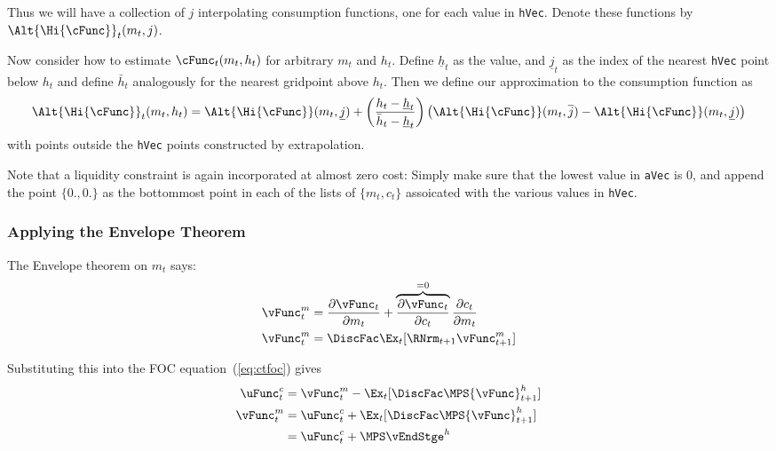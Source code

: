 \documentclass[\econtexRoot/SolvingMicroDSOPs]{subfiles}
\begin{document}
Thus we will have a collection of $j$ interpolating consumption
functions, one for each value in \texttt{hVec}.  Denote these
functions by $\Alt{\Hi{\cFunc}}_{t}({m}_{t},j)$.

Now consider how to estimate $\cFunc_{t}({m}_{t},h_{t})$ for arbitrary
${m}_{t}$ and $h_{t}$.  Define $\underline{h}_{t}$ as the value, and
$\underline{j}_{t}$ as the index of the nearest \texttt{hVec} point
below $h_{t}$ and define $\bar{h}_{t}$ analogously for the nearest
gridpoint above $h_{t}$.  Then we define our approximation to the
consumption function as
\begin{displaymath}
  \Alt{\Hi{\cFunc}}_{t}({m}_{t},h_{t}) =
  \Alt{\Hi{\cFunc}}({m}_{t},\underline{j})+\left(\frac{h_{t}-\underline{h}_{t}}
    {\bar{h}_{t}-\underline{h}_{t}}\right)
  \left(\Alt{\Hi{\cFunc}}({m}_{t},\overline{j})
    -\Alt{\Hi{\cFunc}}({m}_{t},\underline{j})\right)
\end{displaymath}
with points outside the \texttt{hVec} points constructed by
extrapolation.

Note that a liquidity constraint is again incorporated at almost
zero cost: Simply make sure that the lowest value in
\texttt{aVec} is 0, and append the point $\{0.,0.\}$ as the
bottommost point in each of the lists of $\{{m}_{t},{c}_{t}\}$
assoicated with the various values in \texttt{hVec}.

\hypertarget{Applying-the-Envelope-Theorem}{}
\subsubsection{Applying the Envelope Theorem}
The Envelope theorem on ${m}_{t}$ says:
\begin{equation}\begin{gathered}\begin{aligned}
  {\vFunc}^{m}_{t}  & = \frac{\partial {\vFunc}_{t}}{\partial {m}_{t}} + \overbrace{\frac{\partial {\vFunc}_{t}}{\partial {c}_{t}}}^{=0}\frac{\partial {c}_{t}}{\partial {m}_{t}} \label{eq:vxt} \\ %
  {\vFunc}_{t}^{m}  & = \DiscFac  \Ex_{t} [\RNrm_{t+1} {\vFunc}_{t+1}^{m}] 
\end{aligned}\end{gathered}\end{equation}

Substituting this into the FOC equation~(\ref{eq:ctfoc}) gives
\begin{equation}\begin{gathered}\begin{aligned}
  \uFunc^{c}_{t}  & = {\vFunc}_{t}^{m}-\Ex_{t}[\DiscFac \MPS {\vFunc}_{t+1}^{h}] %
  \\ {\vFunc}_{t}^{m}  & = \uFunc^{c}_{t}+\Ex_{t}[\DiscFac \MPS {\vFunc}_{t+1}^{h}] \label{eq:vtfoc}
  \\            & = \uFunc^{c}_{t}+\MPS \vEndStge^{h} %
\end{aligned}\end{gathered}\end{equation}
\end{document}
